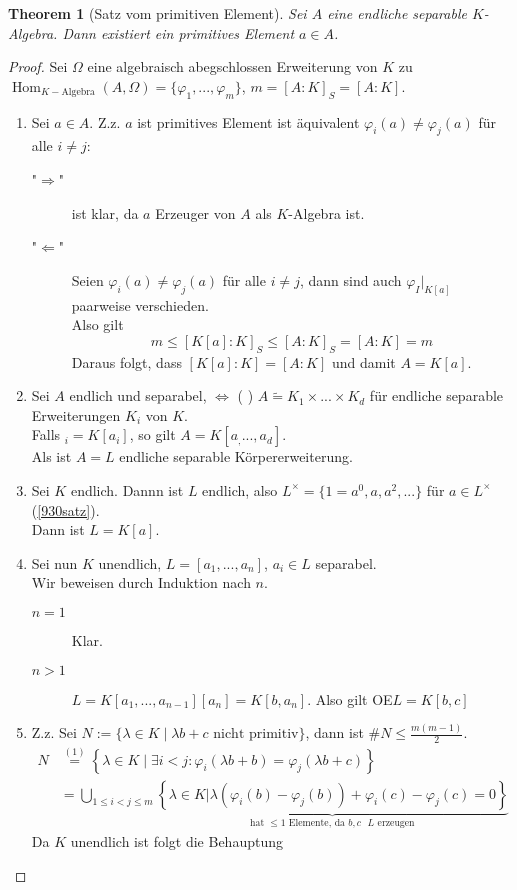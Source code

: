 \documentclass[10pt,a4paper]{article}
\newcommand{\la}{\ensuremath{\lambda}}
\newcommand{\isomorph}{\ensuremath{\tilde{=}}}
\newcommand{\Hom}{\operatorname{Hom}}
\newcounter{thm}[section]
\theoremstyle{definition}
\theoremstyle{plain}
\newtheorem{theorem}[thm]{Theorem}
\theoremstyle{remark}
\begin{document}
\begin{theorem}[Satz vom primitiven Element]\label{932thmPrimitiv}
	Sei $A$ eine endliche separable $K$-Algebra. Dann existiert ein primitives Element $a\in A$.
\end{theorem}
\begin{proof}
	Sei $\Omega$ eine algebraisch abegschlossen Erweiterung von $K$ zu $\Hom_{K-\text{Algebra}}(A,\Omega)=\{\varphi_1,...,\varphi_m\}$, $m=[A:K]_S=[A:K]$.
	\begin{enumerate}
		\item Sei $a\in A$. Z.z. $a$ ist primitives Element ist äquivalent $\varphi_i(a)\neq\varphi_j(a)$ für alle $i\neq j$:
		\begin{description}
			\item["$\Rightarrow$"] ist klar, da $a$ Erzeuger von $A$ als $K$-Algebra ist.
			\item["$\Leftarrow$"] Seien $\varphi_i(a)\neq\varphi_j(a)$ für alle $i\neq j$, dann sind auch $\varphi_I|_{K[a]}$ paarweise verschieden.\\
			Also gilt
			\[m\le [K[a]:K]_S\leq[A:K]_S=[A:K]=m\]
			Daraus folgt, dass $[K[a]:K]=[A:K]$ und damit $A=K[a]$.
		\end{description}
		\item Sei $A$ endlich und separabel, $\Leftrightarrow$ ( %
		) $A\isomorph K_1\times...\times K_d$ für endliche separable Erweiterungen $K_i$ von $K$.\\
		Falls $_i=K[a_i]$, so gilt $A=K[a_,...,a_d]$.\\
		Als ist $A=L$ endliche separable Körpererweiterung.
		\item Sei $K$ endlich. Dannn ist $L$ endlich, also $L^\times=\{1=a^0,a,a^2,...\}$ für $a\in L^\times$ (\ref{930satz}).\\
		Dann ist $L=K[a]$.
		\item Sei nun $K$ unendlich, $L=[a_1,...,a_n]$, $a_i\in L$ separabel.\\
		Wir beweisen durch Induktion nach $n$.
		\begin{description}
			\item[$n=1$] Klar.
			\item[$n>1$] $L=K[a_1,...,a_{n-1}][a_n]=K[b,a_n]$. Also gilt OE$L=K[b,c]$
		\end{description}
		\item Z.z. Sei $N:=\{\la\in K\mid \la b+c\text{ nicht primitiv}\}$, dann ist $\#N\leq \frac{m(m-1)}{2}$.
		\begin{align*}
		N&\overset{(1)}{=}\left\{\la\in K\mid \exists i<j:\varphi_i(\la b+b)=\varphi_j(\la b+c)\right\}\\
		&=\bigcup_{1\leq i<j\leq m}\underbrace{\left\{\la\in K|\la(\varphi
		_i(b)-\varphi_j(b))+\varphi_i(c)-\varphi_j(c)=0\right\}}_{\text{hat $\leq 1$ Elemente, da $b,c$ $L$ erzeugen}}
		\end{align*}
		Da $K$ unendlich ist folgt die Behauptung\\
	\end{enumerate}
\end{proof}
\end{document}
